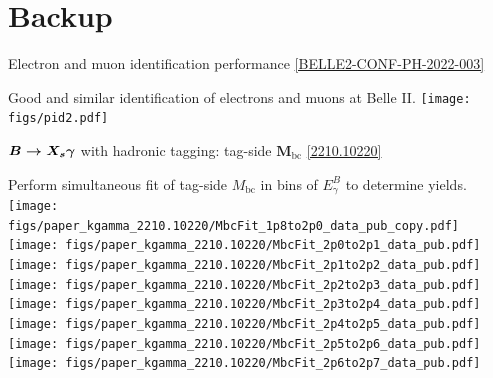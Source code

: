 \section*{Backup} %
\begin{frame}{Electron and muon identification performance \hfill \href{https://docs.belle2.org/record/2895/files/Lepton_identification_Moriond_2022__v2.pdf}{\tiny [BELLE2-CONF-PH-2022-003]}}
\bi
\item {\footnotesize Good and similar identification of electrons and muons at Belle II.}
\ei
\vspace{0.5cm}
\centering
\texttt{[image: figs/pid2.pdf]}
\end{frame}
\begin{frame}{$\boldsymbol{B\rightarrow X_s\gamma}$ with hadronic tagging: tag-side $\boldsymbol{M_{\mathrm{bc}}}$ \hfill \href{https://arxiv.org/abs/2210.10220}{[2210.10220]}}
\bi
\item {\footnotesize Perform simultaneous fit of tag-side $M_{\mathrm{bc}}$ in bins of $E_\gamma^B$ to determine \BB yields.}
\ei
\centering
\vspace{0.5cm}
\texttt{[image: figs/paper\_kgamma\_2210.10220/MbcFit\_1p8to2p0\_data\_pub\_copy.pdf]}
\texttt{[image: figs/paper\_kgamma\_2210.10220/MbcFit\_2p0to2p1\_data\_pub.pdf]}
\texttt{[image: figs/paper\_kgamma\_2210.10220/MbcFit\_2p1to2p2\_data\_pub.pdf]}
\texttt{[image: figs/paper\_kgamma\_2210.10220/MbcFit\_2p2to2p3\_data\_pub.pdf]}\\
\texttt{[image: figs/paper\_kgamma\_2210.10220/MbcFit\_2p3to2p4\_data\_pub.pdf]}
\texttt{[image: figs/paper\_kgamma\_2210.10220/MbcFit\_2p4to2p5\_data\_pub.pdf]}
\texttt{[image: figs/paper\_kgamma\_2210.10220/MbcFit\_2p5to2p6\_data\_pub.pdf]}
\texttt{[image: figs/paper\_kgamma\_2210.10220/MbcFit\_2p6to2p7\_data\_pub.pdf]}
\end{frame}
